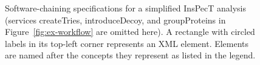 \documentclass[arial,11pt]{article}
\newcommand{\SF}[1]{\textsf{#1}}
\begin{document}

\begin{figure}[ht!]
  \noindent{}
  \caption{\footnotesize
    Software-chaining specifications for a simplified InsPecT analysis
    (services \SF{createTries}, \SF{introduceDecoy}, and \SF{groupProteins} in Figure~\ref{fig:ex-workflow} are omitted here).
     A rectangle with circled labels in its top-left corner represents an XML element.
     Elements are named after the concepts they represent as listed in the legend.
     }
  \label{fig:flex}
\end{figure}
\end{document}

